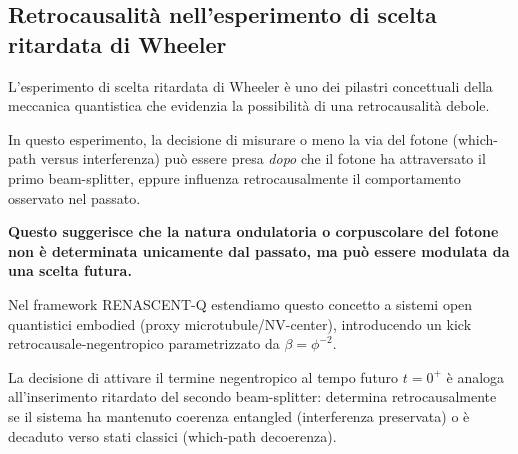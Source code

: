 \documentclass[11pt,a4paper]{article}
\let\oldcite\cite
\renewcommand{\cite}{\protect\oldcite}
\theoremstyle{plain}
\theoremstyle{definition}
\begin{document}
\vspace{0.8cm}



\subsection{Retrocausalità nell'esperimento di scelta ritardata di Wheeler}
\label{subsec:wheeler_retro}


\vspace{0.2cm}

L'esperimento di scelta ritardata di Wheeler \cite{wheeler_delayed_choice_1978} è uno dei pilastri concettuali della meccanica quantistica che evidenzia la possibilità di una retrocausalità debole. 


\vspace{0.5cm}

In questo esperimento, la decisione di misurare o meno la via del fotone (which-path versus interferenza) può essere presa \emph{dopo} che il fotone ha attraversato il primo beam-splitter, eppure influenza retrocausalmente il comportamento osservato nel passato.


\vspace{0.6cm}


\textbf{Questo suggerisce che la natura ondulatoria o corpuscolare del fotone non è determinata unicamente dal passato, ma può essere modulata da una scelta futura.}



\vspace{0.6cm}





Nel framework RENASCENT-Q estendiamo questo concetto a sistemi open quantistici embodied (proxy microtubule/NV-center), introducendo un kick retrocausale-negentropico parametrizzato da $\beta = \phi^{-2}$. 



\vspace{0.6cm}



La decisione di attivare il termine negentropico al tempo futuro $t=0^+$ è analoga all'inserimento ritardato del secondo beam-splitter: determina retrocausalmente se il sistema ha mantenuto coerenza entangled (interferenza preservata) o è decaduto verso stati classici (which-path decoerenza).


\vspace{0.6cm}
\end{document}
